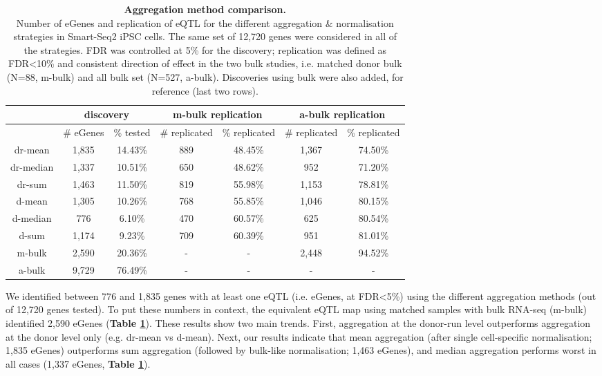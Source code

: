 \begin{table}[h]
    \centering
    \begin{tabular}{c|c c|c c|c c}
    & \multicolumn{2}{c}{discovery}&\multicolumn{2}{c}{m-bulk replication} &\multicolumn{2}{c}{a-bulk replication}\\
    \hline
    & \# eGenes & \% tested & \# replicated & \% replicated & \# replicated & \% replicated \\
    \hline
    dr-mean   &  1,835 & 14.43\% & 889 & 48.45\% & 1,367 & 74.50\% \\
    dr-median &  1,337 & 10.51\% & 650 & 48.62\% &   952 & 71.20\% \\
    dr-sum    &  1,463 & 11.50\% & 819 & 55.98\% & 1,153 & 78.81\% \\
    d-mean    &  1,305 & 10.26\% & 768 & 55.85\% & 1,046 & 80.15\% \\
    d-median  &    776 &  6.10\% & 470 & 60.57\% &   625 & 80.54\% \\
    d-sum     &  1,174 &  9.23\% & 709 & 60.39\% &   951 & 81.01\% \\
    \hline
    m-bulk    &  2,590 & 20.36\% & - & - & 2,448 & 94.52\% \\
    a-bulk    &  9,729 & 76.49\% & - & - & - & - \\
    \end{tabular}
    \caption[Aggregation method comparison]{\textbf{Aggregation method comparison.}\\
    Number of eGenes and replication of eQTL for the different aggregation \& normalisation strategies in Smart-Seq2 iPSC cells. 
    The same set of 12,720 genes were considered in all of the strategies.
    FDR was controlled at 5\% for the discovery; replication was defined as FDR<10\% and consistent direction of effect in the two bulk studies, i.e. matched donor bulk (N=88, m-bulk) and all bulk set (N=527, a-bulk).
    Discoveries using bulk were also added, for reference (last two rows).}
    \label{tab:egenes}
\end{table}

We identified between 776 and 1,835 genes with at least one eQTL (i.e. eGenes, at FDR<5\%) using the different aggregation methods (out of 12,720 genes tested). 
To put these numbers in context, the equivalent eQTL map using matched samples with bulk RNA-seq (m-bulk) identified 2,590 eGenes (\textbf{Table \ref{tab:egenes}}). 
These results show two main trends. 
First, aggregation at the donor-run level outperforms aggregation at the donor level only (e.g. dr-mean vs d-mean). 
Next, our results indicate that mean aggregation (after single cell-specific normalisation; 1,835 eGenes) outperforms sum aggregation (followed by bulk-like normalisation; 1,463 eGenes), and median aggregation performs worst in all cases (1,337 eGenes, \textbf{Table \ref{tab:egenes}}). \\

